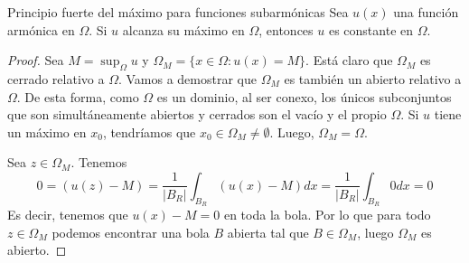 \begin{mathresult}{Principio fuerte del máximo para funciones subarmónicas}
Sea $u(x)$ una función armónica en $\Omega$. Si $u$ alcanza su máximo en $\Omega$, entonces $u$ es constante en $\Omega$.
\end{mathresult}
\begin{proof}
Sea $M=\sup_\Omega u$ y $\Omega_M = \{x\in\Omega: u(x) = M\}$. Está claro que $\Omega_M$ es cerrado relativo a $\Omega$. Vamos a demostrar que $\Omega_M$ es también un abierto relativo a $\Omega$. De esta forma, como $\Omega$ es un dominio, al ser conexo, los únicos subconjuntos que son simultáneamente abiertos y cerrados son el vacío y el propio $\Omega$. Si $u$ tiene un máximo en $x_0$, tendríamos que $x_0\in\Omega_M\neq\emptyset$. Luego, $\Omega_M = \Omega$.

Sea $z\in\Omega_M$. Tenemos
$$0=(u(z) - M) = \frac{1}{|B_R|}\int_{B_R}(u(x)-M)dx = \frac{1}{|B_R|}\int_{B_R} 0dx = 0$$
Es decir, tenemos que $u(x)-M = 0$ en toda la bola. Por lo que para todo $z\in\Omega_M$ podemos encontrar una bola $B$ abierta tal que $B\in\Omega_M$, luego $\Omega_M$ es abierto.
\end{proof}

